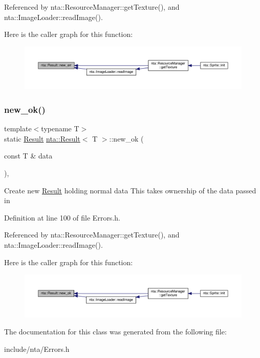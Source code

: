 Referenced by nta\+::\+Resource\+Manager\+::get\+Texture(), and nta\+::\+Image\+Loader\+::read\+Image().

Here is the caller graph for this function\+:\nopagebreak
\begin{figure}[H]
\begin{center}
\leavevmode
\includegraphics[width=350pt]{d8/d2e/classnta_1_1Result_ad65a9140ae2a03cfb13bd30f848b1aa5_icgraph}
\end{center}
\end{figure}
\mbox{\label{classnta_1_1Result_af193a336ab789de94a975c6f0a039e40}} 
\subsubsection{\texorpdfstring{new\+\_\+ok()}{new\_ok()}}
{\footnotesize\ttfamily template$<$typename T$>$ \\
static \hyperlink{classnta_1_1Result}{Result} \hyperlink{classnta_1_1Result}{nta\+::\+Result}$<$ T $>$\+::new\+\_\+ok (\begin{DoxyParamCaption}\item[{const T \&}]{data }\end{DoxyParamCaption})\hspace{0.3cm}{\ttfamily [inline]}, {\ttfamily [static]}}

Create new \hyperlink{classnta_1_1Result}{Result} holding normal data This takes ownership of the data passed in 

Definition at line 100 of file Errors.\+h.



Referenced by nta\+::\+Resource\+Manager\+::get\+Texture(), and nta\+::\+Image\+Loader\+::read\+Image().

Here is the caller graph for this function\+:\nopagebreak
\begin{figure}[H]
\begin{center}
\leavevmode
\includegraphics[width=350pt]{d8/d2e/classnta_1_1Result_af193a336ab789de94a975c6f0a039e40_icgraph}
\end{center}
\end{figure}


The documentation for this class was generated from the following file\+:\begin{DoxyCompactItemize}
\item 
include/nta/Errors.\+h\end{DoxyCompactItemize}
